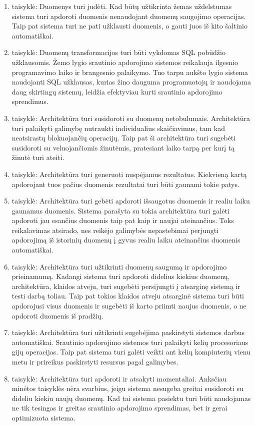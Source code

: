 \documentclass{VUMIFPSkursinis}
\begin{document}
\begin{enumerate}[label=\arabic*]
    \item taisyklė: Duomenys turi judėti. Kad būtų užtikrinta žemas uždelstumas sistema turi apdoroti duomenis nenaudojant duomenų saugojimo operacijas. Taip pat sistema turi ne pati užklausti duomenis, o gauti juos
    iš kito šaltinio automatiškai. 
    \item taisyklė: Duomenų transformacijos turi būti vykdomas SQL pobūdžio užklausomis. Žemo lygio srautinio apdorojimo sistemos reikalauja ilgesnio programavimo laiko ir brangesnio palaikymo. Tuo tarpu aukšto lygio sistema 
    naudojanti SQL užklausas, kurias žino dauguma programuotojų ir naudojama daug skirtingų sistemų, leidžia efektyviau kurti srautinio apdorojimo sprendimus.
    \item taisyklė: Architektūra turi susidoroti su duomenų netobulumais. Architektūra turi palaikyti galimybę nutraukti individualius skaičiavimus, tam kad neatsirastų blokuojančių operacijų. Taip pat ši 
    architektūra turi sugebėti susidoroti su veluojančiomis žinutėmis, pratesiant laiko tarpą per kurį tą žinutė turi ateiti.
    \item taisyklė: Architektūra turi generuoti nuspėjamus rezultatus. Kiekvieną kartą apdorojant tuos pačius duomenis rezultatai turi būti gaunami tokie patys.
    \item taisyklė: Architektūra turi gebėti apdoroti išsaugotus duomenis ir realiu laiku gaunamus duomenis. Sistema parašyta su tokia architektūra turi galėti apdoroti jau esančius duomenis taip pat kaip ir 
    naujai ateinančius. Toks reikalavimas atsirado, nes reikėjo galimybės nepastebimai perjungti apdorojimą iš istorinių duomenų į gyvus realiu laiku ateinančius duomenis automatiškai.
    \item taisyklė: Architektūra turi užtikrinti duomenų saugumą ir apdorojimo prieinamumą. Kadangi sistema turi apdoroti didelius kiekius duomenų, architektūra, klaidos atveju, turi sugebėti persijungti į atsarginę
    sistemą ir testi darbą toliau. Taip pat tokios klaidos atveju atsarginė sistema turi būti apdorojusi visus duomenis ir sugebėti iš karto priimti naujus duomenis, o ne apdoroti duomenis iš pradžių.
    \item taisyklė: Architektūra turi užtikrinti sugebėjima paskirstyti sistemos darbus automatiškai. Srautinio apdorojimo sistemos turi palaikyti kelių procesoriaus gijų operacijas. Taip pat sistema turi galėti 
    veikti ant kelių kompiuterių vienu metu ir prireikus paskirstyti resursus pagal galimybes.
    \item taisyklė: Architektūra turi apdoroti ir atsakyti momentaliai. Anksčiau minėtos taisyklės nėra svarbius, jeigu sistema nesugeba greitai susidoroti su dideliu kiekiu naujų duomenų. Kad tai sistema
    pasiektu turi būti naudojamas ne tik tesingas ir greitas srautinio apdorojimo sprendimas, bet ir gerai optimizuota sistema.
\end{enumerate}\par
\end{document}
